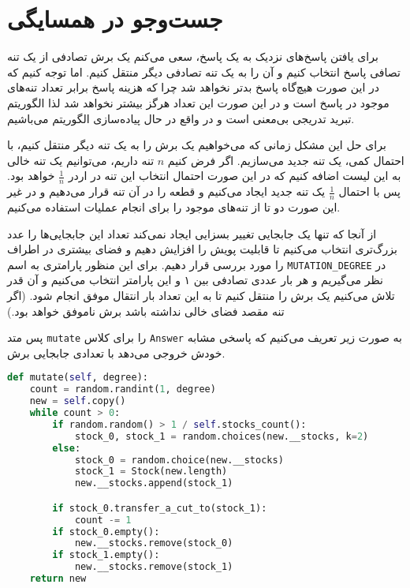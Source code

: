 \documentclass[a4paper, 12pt]{article}
\begin{document}
\newpage
\section{جست‌وجو در همسایگی}
برای یافتن پاسخ‌های نزدیک به یک پاسخ، سعی می‌کنم یک برش تصادفی از یک تنه تصافی پاسخ انتخاب کنیم و آن را به یک تنه تصادفی دیگر منتقل کنیم. اما توجه کنیم که در این صورت هیچ‌گاه پاسخ بدتر نخواهد شد چرا که هزینه پاسخ برابر تعداد تنه‌های موجود در پاسخ است و در این صورت این تعداد هرگز بیشتر نخواهد شد لذا الگوریتم تبرید تدریجی بی‌معنی است و در واقع در حال پیاده‌سازی الگوریتم
می‌باشیم.

برای حل این مشکل زمانی که می‌خواهیم یک برش را به یک تنه دیگر منتقل کنیم، با احتمال کمی، یک تنه جدید می‌سازیم. اگر فرض کنیم
$n$
تنه داریم، می‌توانیم یک تنه خالی به این لیست اضافه کنیم که در این صورت احتمال انتخاب این تنه در اردر
$\frac{1}{n}$
خواهد بود. پس با احتمال
$\frac{1}{n}$
یک تنه جدید ایجاد می‌کنیم و قطعه را در آن تنه قرار می‌دهیم و در غیر این صورت دو تا از تنه‌های موجود را برای انجام عملیات استفاده می‌کنیم.

از آنجا که تنها یک جابجایی تغییر بسزایی ایجاد نمی‌کند تعداد این جابجایی‌ها را عدد بزرگ‌تری انتخاب می‌کنیم تا قابلیت پویش را افزایش دهیم و فضای بیشتری در اطراف را مورد بررسی قرار دهیم. برای این منظور پارامتری به اسم
\texttt{MUTATION\_DEGREE}
در نظر می‌گیریم و هر بار عددی تصادفی بین ۱ و این پارامتر انتخاب می‌کنیم و آن قدر تلاش می‌کنیم یک برش را منتقل کنیم تا به این تعداد بار انتقال موفق انجام شود. (اگر تنه مقصد فضای خالی نداشته باشد برش ناموفق خواهد بود.)

پس متد
\texttt{mutate}
را برای کلاس
\texttt{Answer}
به صورت زیر تعریف می‌کنیم که پاسخی مشابه خودش خروجی می‌دهد با تعدادی جابجایی برش.

\LTR
\begin{lstlisting}[language=Python]
def mutate(self, degree):
    count = random.randint(1, degree)
    new = self.copy()
    while count > 0:
        if random.random() > 1 / self.stocks_count():
            stock_0, stock_1 = random.choices(new.__stocks, k=2)
        else:
            stock_0 = random.choice(new.__stocks)
            stock_1 = Stock(new.length)
            new.__stocks.append(stock_1)

        if stock_0.transfer_a_cut_to(stock_1):
            count -= 1
        if stock_0.empty():
            new.__stocks.remove(stock_0)
        if stock_1.empty():
            new.__stocks.remove(stock_1)
    return new
\end{lstlisting}
\RTL
\end{document}
